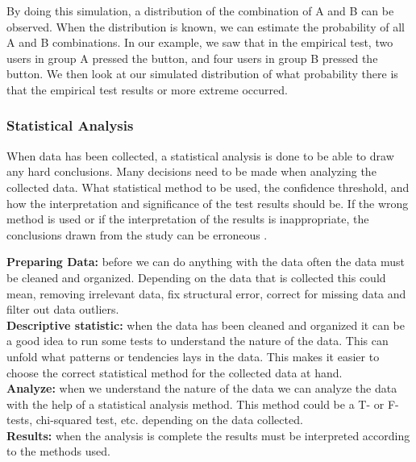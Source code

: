 By doing this simulation, a distribution of the combination of A and B can be observed. When the distribution is known, we can estimate the probability of all A and B combinations. In our example, we saw that in the empirical test, two users in group A pressed the button, and four users in group B pressed the button.  We then look at our simulated distribution of what probability there is that the empirical test results or more extreme occurred.  


\subsubsection{Statistical Analysis}%
\label{sub:Statistical analysis}
When data has been collected, a statistical analysis is done to be able to draw any hard conclusions. Many decisions need to be made when analyzing the collected data. What statistical method to be used, the confidence threshold, and how the interpretation and significance of the test results should be. If the wrong method is used or if the interpretation of the results is inappropriate, the conclusions drawn from the study can be erroneous \cite{lazar2017research}. 

\textbf{Preparing Data:} before we can do anything with the data often the data must be cleaned and organized. Depending on the data that is collected this could mean, removing irrelevant data, fix structural error, correct for missing data and filter out data outliers.\\
\textbf{Descriptive statistic:} when the data has been cleaned and organized it can be a good idea to run some tests to understand the nature of the data. This can unfold what patterns or tendencies lays in the data. This makes it easier to choose the correct statistical method for the collected data at hand.\\
\textbf{Analyze:} when we understand the nature of the data we can analyze the data with the help of a statistical analysis method. This method could be a T- or F-tests, chi-squared test, etc. depending on the data collected.\\ 
\textbf{Results:} when the analysis is complete the results must be interpreted according to the methods used.\\



